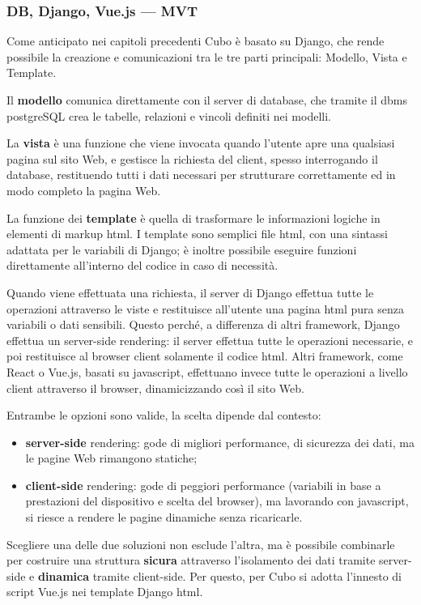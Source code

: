 \documentclass[12pt,a4paper]{article}
\begin{document}
\subsubsection{DB, Django, Vue.js --- MVT}
Come anticipato nei capitoli precedenti Cubo è basato su Django, che rende possibile la creazione e comunicazioni tra le tre parti principali: Modello, Vista e Template.

Il \textbf{modello} comunica direttamente con il server di database, che tramite il dbms postgreSQL crea le tabelle, relazioni e vincoli definiti nei modelli.

La \textbf{vista} è una funzione che viene invocata quando l’utente apre una qualsiasi pagina sul sito Web, e gestisce la richiesta del client, spesso interrogando il database, restituendo tutti i dati necessari per strutturare correttamente ed in modo completo la pagina Web.

La funzione dei \textbf{template} è quella di trasformare le informazioni logiche in elementi di markup html.
I template sono semplici file html, con una sintassi adattata per le variabili di Django; è inoltre possibile eseguire funzioni direttamente all’interno del codice in caso di necessità.

Quando viene effettuata una richiesta, il server di Django effettua tutte le operazioni attraverso le viste e restituisce all’utente una pagina html pura senza variabili o dati sensibili. Questo perché, a differenza di altri framework, Django effettua un server-side rendering: il server effettua tutte le operazioni necessarie, e poi restituisce al browser client solamente il codice html.
Altri framework, come React o Vue.js, basati su javascript, effettuano invece tutte le operazioni a livello client attraverso il browser, dinamicizzando così il sito Web.

Entrambe le opzioni sono valide, la scelta dipende dal contesto:
\begin{itemize}
    \item \textbf{server-side} rendering: gode di migliori performance, di sicurezza dei dati, ma le pagine Web rimangono statiche;
    \item \textbf{client-side} rendering: gode di peggiori performance (variabili in base a prestazioni del dispositivo e scelta del browser), ma lavorando con javascript, si riesce a rendere le pagine dinamiche senza ricaricarle.
\end{itemize}
Scegliere una delle due soluzioni non esclude l’altra, ma è possibile combinarle per costruire una struttura \textbf{sicura} attraverso l’isolamento dei dati tramite server-side e \textbf{dinamica} tramite client-side. Per questo, per Cubo si adotta l’innesto di script Vue.js nei template Django html.
\end{document}
